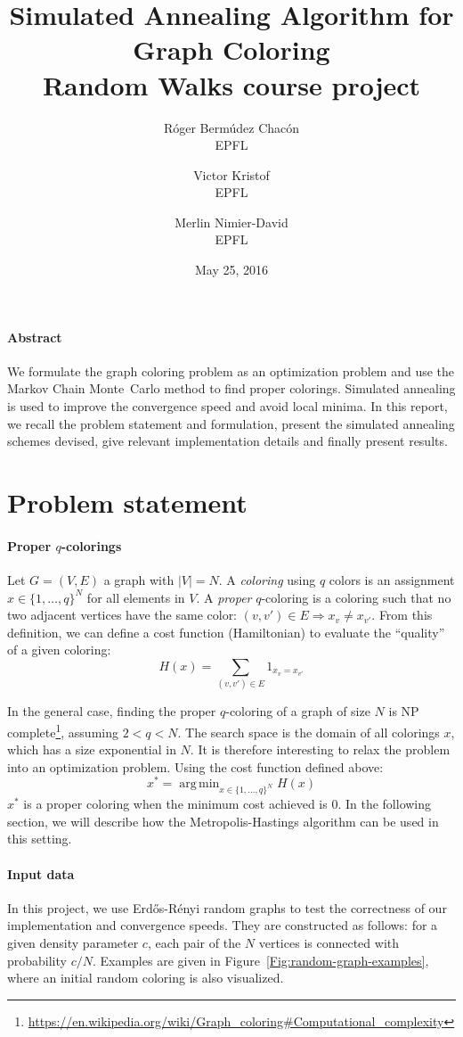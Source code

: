 \documentclass{article}
\title{Simulated Annealing Algorithm for Graph Coloring\\Random Walks course project}
\date{May 25, 2016}
\author{
  R\'oger Berm\'udez Chac\'on\\EPFL
  \and
  Victor Kristof\\EPFL
  \and
  Merlin Nimier-David\\EPFL
}
\DeclareMathOperator*{\argmin}{arg\,min}
\begin{document}
  \maketitle

  \paragraph{Abstract}
  We formulate the graph coloring problem as an optimization problem and use the Markov Chain Monte~Carlo method to find proper colorings. Simulated annealing is used to improve the convergence speed and avoid local minima. In this report, we recall the problem statement and formulation, present the simulated annealing schemes devised, give relevant implementation details and finally present results.

  \section*{Problem statement}
  \paragraph{Proper $q$-colorings}
  Let $G = (V, E)$ a graph with $|V| = N$. A \emph{coloring} using $q$ colors is an assignment $x \in \{ 1, \ldots, q \}^N$ for all elements in $V$. A \emph{proper} $q$-coloring is a coloring such that no two adjacent vertices have the same color: $(v, v') \in E \Rightarrow x_v \neq x_{v'}$. From this definition, we can define a cost function (Hamiltonian) to evaluate the ``quality'' of a given coloring:
  \[
    H(x) = \sum_{(v, v') \in E} 1_{x_v = x_{v'}}
  \]

  In the general case, finding the proper $q$-coloring of a graph of size $N$ is NP complete\footnote{\url{https://en.wikipedia.org/wiki/Graph_coloring#Computational_complexity}}, assuming $2 < q < N$. The search space is the domain of all colorings $x$, which has a size exponential in $N$. It is therefore interesting to relax the problem into an optimization problem. Using the cost function defined above:
  \[
    x^* = \argmin_{x \in \{ 1, \ldots, q \}^N} H(x)
  \]
  $x^*$ is a proper coloring when the minimum cost achieved is $0$. In the following section, we will describe how the Metropolis-Hastings algorithm can be used in this setting.

  \paragraph{Input data}
  In this project, we use Erd\H{o}s-R\'{e}nyi random graphs to test the correctness of our implementation and convergence speeds. They are constructed as follows: for a given density parameter $c$, each pair of the $N$ vertices is connected with probability $c / N$. Examples are given in Figure~\ref{Fig:random-graph-examples}, where an initial random coloring is also visualized.
\end{document}
